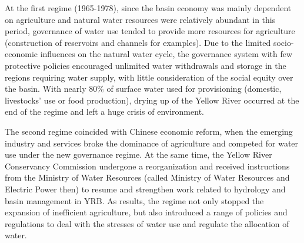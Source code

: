 \documentclass[9pt, twocolumn, twoside, lineno]{pnas-new}
\begin{document}
At the first regime (1965-1978), since the basin economy was mainly dependent on agriculture and natural water resources were relatively abundant in this period, governance of water use tended to provide more resources for agriculture (construction of reservoirs and channels for examples). 
Due to the limited socio-economic influences on the natural water cycle, the governance system with few protective policies encouraged unlimited water withdrawals and storage in the regions requiring water supply, with little consideration of the social equity over the basin. 
With nearly 80\% of surface water used for provisioning (domestic, livestocks' use or food production), drying up of the Yellow River occurred at the end of the regime and left a huge crisis of environment.

The second regime coincided with Chinese economic reform, when the emerging industry and services broke the dominance of agriculture and competed for water use under the new governance regime. 
At the same time, the Yellow River Conservancy Commission undergone a reorganization and received instructions from the Ministry of Water Resources (called Ministry of Water Resources and Electric Power then) to resume and strengthen work related to hydrology and basin management in YRB.
As results, the regime not only stopped the expansion of inefficient agriculture, but also introduced a range of policies and regulations to deal with the stresses of water use and regulate the allocation of water.
\end{document}
